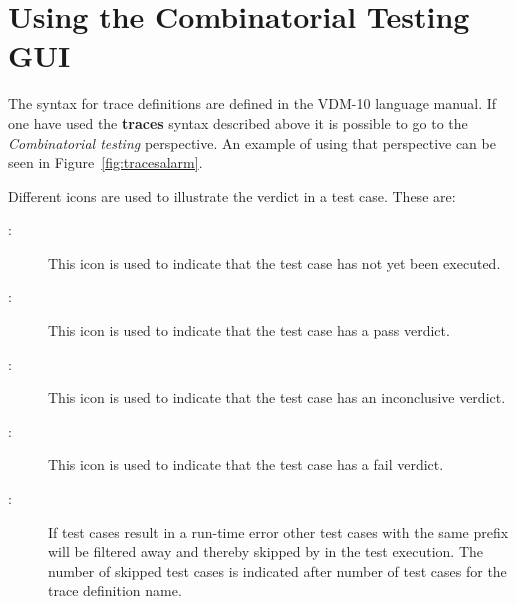 \documentclass{overturerepchap}
\begin{document}
\section{Using the Combinatorial Testing GUI}

The syntax for trace definitions are defined in the VDM-10 language
manual.
If one have used the {\bf\ttfamily traces} syntax described above it
is possible to go to the \emph{Combinatorial testing}
perspective. An example of using that
perspective can be seen in
Figure~\ref{fig:tracesalarm}.

Different icons are used to illustrate the verdict in a test
case. These are:
\begin{description}
\item[\hspace{-1.8mm}
:]
  This icon is used to indicate that the test case has not yet been
  executed.
\item[\hspace{-1.8mm}
:] This icon is used to indicate that the test case has a pass
  verdict.
\item[\hspace{-1.8mm}
:] This icon is used to indicate that the test case has an inconclusive
  verdict.
\item[\hspace{-1.8mm}
:]
This icon is used to indicate that the test case has a fail
verdict.
\item[\hspace{-1.8mm}
:] 
If test cases result in a run-time error other test cases with the
same prefix will be filtered away and thereby skipped by in the test
execution. The number of skipped test cases is indicated after number
of test cases for the trace definition name.
\end{description}
\end{document}
